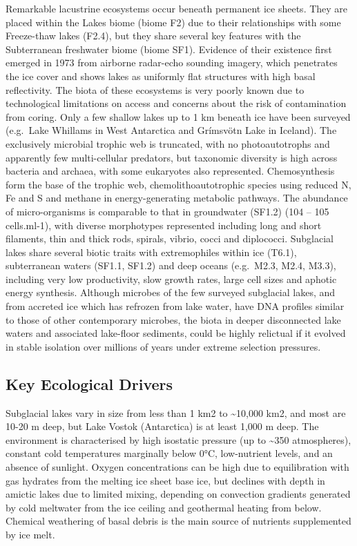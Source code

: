 \documentclass[
  letterpaper,
  DIV=11,
  numbers=noendperiod]{scrartcl}
\begin{document}
Remarkable lacustrine ecosystems occur beneath permanent ice sheets.
They are placed within the Lakes biome (biome F2) due to their
relationships with some Freeze-thaw lakes (F2.4), but they share several
key features with the Subterranean freshwater biome (biome SF1).
Evidence of their existence first emerged in 1973 from airborne
radar-echo sounding imagery, which penetrates the ice cover and shows
lakes as uniformly flat structures with high basal reflectivity. The
biota of these ecosystems is very poorly known due to technological
limitations on access and concerns about the risk of contamination from
coring. Only a few shallow lakes up to 1 km beneath ice have been
surveyed (e.g.~Lake Whillams in West Antarctica and Grímsvötn Lake in
Iceland). The exclusively microbial trophic web is truncated, with no
photoautotrophs and apparently few multi-cellular predators, but
taxonomic diversity is high across bacteria and archaea, with some
eukaryotes also represented. Chemosynthesis form the base of the trophic
web, chemolithoautotrophic species using reduced N, Fe and S and methane
in energy-generating metabolic pathways. The abundance of
micro-organisms is comparable to that in groundwater (SF1.2) (104 -- 105
cells.ml-1), with diverse morphotypes represented including long and
short filaments, thin and thick rods, spirals, vibrio, cocci and
diplococci. Subglacial lakes share several biotic traits with
extremophiles within ice (T6.1), subterranean waters (SF1.1, SF1.2) and
deep oceans (e.g.~M2.3, M2.4, M3.3), including very low productivity,
slow growth rates, large cell sizes and aphotic energy synthesis.
Although microbes of the few surveyed subglacial lakes, and from
accreted ice which has refrozen from lake water, have DNA profiles
similar to those of other contemporary microbes, the biota in deeper
disconnected lake waters and associated lake-floor sediments, could be
highly relictual if it evolved in stable isolation over millions of
years under extreme selection pressures.

\subsection{Key Ecological Drivers}\label{key-ecological-drivers-8}

Subglacial lakes vary in size from less than 1 km2 to
\textasciitilde10,000 km2, and most are 10-20 m deep, but Lake Vostok
(Antarctica) is at least 1,000 m deep. The environment is characterised
by high isostatic pressure (up to \textasciitilde350 atmospheres),
constant cold temperatures marginally below 0°C, low-nutrient levels,
and an absence of sunlight. Oxygen concentrations can be high due to
equilibration with gas hydrates from the melting ice sheet base ice, but
declines with depth in amictic lakes due to limited mixing, depending on
convection gradients generated by cold meltwater from the ice ceiling
and geothermal heating from below. Chemical weathering of basal debris
is the main source of nutrients supplemented by ice melt.
\end{document}

